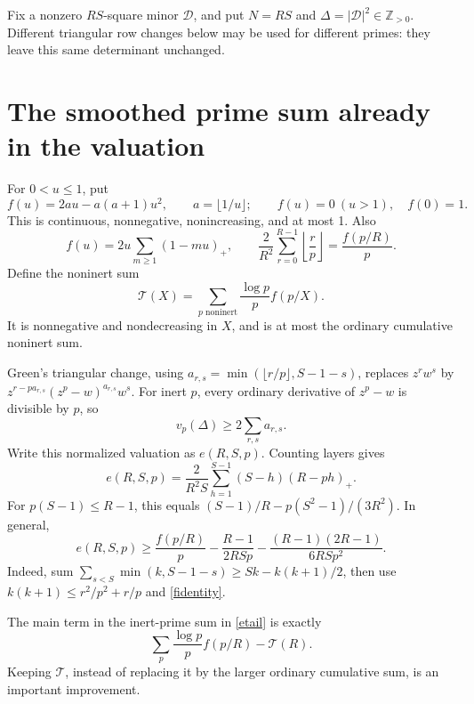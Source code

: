 \documentclass[11pt]{article}
\newcommand{\Z}{\mathbb Z}
\newcommand{\Tn}{\mathcal T}
\begin{document}
Fix a nonzero \(RS\)-square minor \(\mathcal D\), and put
\(N=RS\) and \(\Delta=|\mathcal D|^2\in\Z_{>0}\).
Different triangular row changes below may be used for different
primes: they leave this same determinant unchanged.

\section{The smoothed prime sum already in the valuation}
For \(0<u\le1\), put
\begin{equation}\label{fdef}
 f(u)=2au-a(a+1)u^2,\qquad a=\lfloor1/u\rfloor;
 \qquad f(u)=0\ (u>1),\quad f(0)=1.
\end{equation}
This is continuous, nonnegative, nonincreasing, and at most 1. Also
\begin{equation}\label{fidentity}
 f(u)=2u\sum_{m\ge1}(1-mu)_+,\qquad
 \frac2{R^2}\sum_{r=0}^{R-1}\left\lfloor\frac rp\right\rfloor
       =\frac{f(p/R)}p.
\end{equation}
Define the noninert sum
\begin{equation}\label{Tdef}
 \Tn(X)=\sum_{p\text{ noninert}}\frac{\log p}{p}f(p/X).
\end{equation}
It is nonnegative and nondecreasing in \(X\), and is at most the
ordinary cumulative noninert sum.

Green's triangular change, using
\(a_{r,s}=\min(\lfloor r/p\rfloor,S-1-s)\), replaces \(z^rw^s\) by
\(z^{r-pa_{r,s}}(z^p-w)^{a_{r,s}}w^s\). For inert \(p\), every
ordinary derivative of \(z^p-w\) is divisible by \(p\), so
\[
 v_p(\Delta)\ge2\sum_{r,s}a_{r,s}.
\]
Write this normalized valuation as \(e(R,S,p)\). Counting layers gives
\begin{equation}\label{elayers}
 e(R,S,p)=\frac2{R^2S}\sum_{h=1}^{S-1}(S-h)(R-ph)_+.
\end{equation}
For \(p(S-1)\le R-1\), this equals
\((S-1)/R-p(S^2-1)/(3R^2)\). In general,
\begin{equation}\label{etail}
 e(R,S,p)\ge\frac{f(p/R)}p
       -\frac{R-1}{2RSp}
       -\frac{(R-1)(2R-1)}{6RSp^2}.
\end{equation}
Indeed, sum
\(\sum_{s<S}\min(k,S-1-s)\ge Sk-k(k+1)/2\), then use
\(k(k+1)\le r^2/p^2+r/p\) and \eqref{fidentity}.

The main term in the inert-prime sum in \eqref{etail} is exactly
\[
 \sum_p\frac{\log p}{p}f(p/R)-\Tn(R).
\]
Keeping \(\Tn\), instead of replacing it by the larger ordinary
cumulative sum, is an important improvement.
\end{document}
